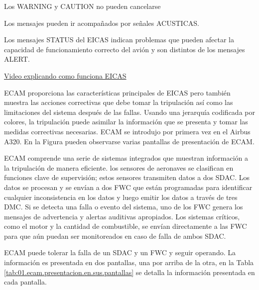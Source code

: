 Los WARNING y CAUTION no pueden cancelarse

Los mensajes pueden ir acompañados por
señales ACUSTICAS.

Los mensajes STATUS del EICAS indican problemas
que pueden afectar la capacidad de funcionamiento correcto
del avión y son distintos de los mensajes ALERT.

\href{https://www.youtube.com/watch?v=wSgB9FoSR5E}{Video explicando como funciona EICAS}


ECAM proporciona las características principales de EICAS pero también muestra las acciones correctivas que debe tomar la tripulación así como las limitaciones del sistema después de las fallas. 
Usando una jerarquía codificada por colores, la tripulación puede asimilar la información que se presenta y tomar las medidas correctivas necesarias. 
ECAM se introdujo por primera vez en el Airbus A320. En la Figura pueden observarse varias pantallas de presentaci\'on de ECAM.

ECAM comprende una serie de sistemas integrados que muestran información a la tripulación de manera eficiente. los sensores de aeronaves se clasifican en funciones clave de supervisión; estos sensores transmiten datos a dos \ac{SDAC}. Los datos se procesan y se envían a dos  \ac{FWC} que están programadas para identificar cualquier inconsistencia en los datos y luego emitir los datos a través de tres \ac{DMC}.
Si se detecta una falla o evento del sistema, uno de los FWC genera los mensajes de advertencia y alertas auditivas apropiados. Los sistemas críticos, como el motor y la cantidad de combustible, se env\'ian directamente a las FWC para que aún puedan ser monitoreados en caso de falla de ambos SDAC. 

ECAM puede tolerar la falla de un SDAC y un FWC y seguir operando. La informaci\'on es presentada en dos pantallas, una por arriba de la otra, en la Tabla \ref{tab:01.ecam.presentacion.en.sus.pantallas} se detalla la informaci\'on presentada en cada pantalla.


